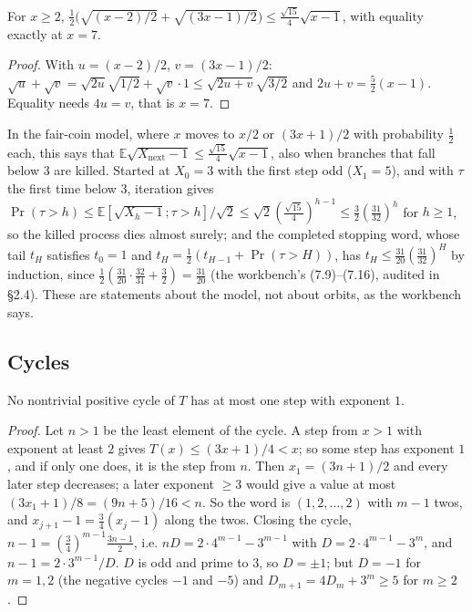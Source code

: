 \begin{proposition}\label{prop:sqrt15}
For $x\ge2$, $\tfrac12\bigl(\sqrt{(x-2)/2}+\sqrt{(3x-1)/2}\bigr)\le\tfrac{\sqrt{15}}4\sqrt{x-1}$, with equality exactly at $x=7$.
\end{proposition}
\begin{proof}
With $u=(x-2)/2$, $v=(3x-1)/2$: $\sqrt u+\sqrt v=\sqrt{2u}\sqrt{1/2}+\sqrt v\cdot1\le\sqrt{2u+v}\sqrt{3/2}$ and $2u+v=\frac52(x-1)$. Equality needs $4u=v$, that is $x=7$.
\end{proof}
In the fair-coin model, where $x$ moves to $x/2$ or $(3x+1)/2$ with probability $\frac12$ each, this says that $\mathbb E\sqrt{X_{\mathrm{next}}-1}\le\frac{\sqrt{15}}4\sqrt{x-1}$, also when branches that fall below $3$ are killed. Started at $X_0=3$ with the first step odd ($X_1=5$), and with $\tau$ the first time below $3$, iteration gives $\Pr(\tau>h)\le\mathbb E[\sqrt{X_h-1};\tau>h]/\sqrt2\le\sqrt2(\frac{\sqrt{15}}4)^{h-1}\le\frac32(\frac{31}{32})^h$ for $h\ge1$, so the killed process dies almost surely; and the completed stopping word, whose tail $t_H$ satisfies $t_0=1$ and $t_H=\frac12(t_{H-1}+\Pr(\tau>H))$, has $t_H\le\frac{31}{20}(\frac{31}{32})^H$ by induction, since $\frac12(\frac{31}{20}\cdot\frac{32}{31}+\frac32)=\frac{31}{20}$ (the workbench's (7.9)--(7.16), audited in  §2.4). These are statements about the model, not about orbits, as the workbench says.

\subsection{Cycles}

\begin{proposition}\label{prop:onestep}
No nontrivial positive cycle of $T$ has at most one step with exponent $1$.
\end{proposition}
\begin{proof}
Let $n>1$ be the least element of the cycle. A step from $x>1$ with exponent at least $2$ gives $T(x)\le(3x+1)/4<x$; so some step has exponent $1$, and if only one does, it is the step from $n$. Then $x_1=(3n+1)/2$ and every later step decreases; a later exponent $\ge3$ would give a value at most $(3x_1+1)/8=(9n+5)/16<n$. So the word is $(1,2,\dots,2)$ with $m-1$ twos, and $x_{j+1}-1=\frac34(x_j-1)$ along the twos. Closing the cycle, $n-1=(\frac34)^{m-1}\frac{3n-1}2$, i.e. $nD=2\cdot4^{m-1}-3^{m-1}$ with $D=2\cdot4^{m-1}-3^m$, and $n-1=2\cdot3^{m-1}/D$. $D$ is odd and prime to $3$, so $D=\pm1$; but $D=-1$ for $m=1,2$ (the negative cycles $-1$ and $-5$) and $D_{m+1}=4D_m+3^m\ge5$ for $m\ge2$.
\end{proof}


